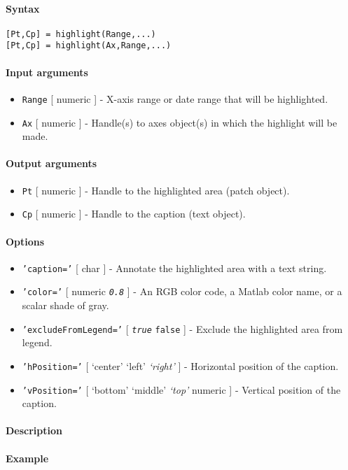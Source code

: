 


	\paragraph{Syntax}

\begin{verbatim}
[Pt,Cp] = highlight(Range,...)
[Pt,Cp] = highlight(Ax,Range,...)
\end{verbatim}

\paragraph{Input arguments}

\begin{itemize}
\item
  \texttt{Range} {[} numeric {]} - X-axis range or date range that will
  be highlighted.
\item
  \texttt{Ax} {[} numeric {]} - Handle(s) to axes object(s) in which the
  highlight will be made.
\end{itemize}

\paragraph{Output arguments}

\begin{itemize}
\item
  \texttt{Pt} {[} numeric {]} - Handle to the highlighted area (patch
  object).
\item
  \texttt{Cp} {[} numeric {]} - Handle to the caption (text object).
\end{itemize}

\paragraph{Options}

\begin{itemize}
\item
  \texttt{'caption='} {[} char {]} - Annotate the highlighted area with
  a text string.
\item
  \texttt{'color='} {[} numeric \textbar{} \emph{\texttt{0.8}} {]} - An
  RGB color code, a Matlab color name, or a scalar shade of gray.
\item
  \texttt{'excludeFromLegend='} {[} \emph{\texttt{true}} \textbar{}
  \texttt{false} {]} - Exclude the highlighted area from legend.
\item
  \texttt{'hPosition='} {[} `center' \textbar{} `left' \textbar{}
  \emph{`right'} {]} - Horizontal position of the caption.
\item
  \texttt{'vPosition='} {[} `bottom' \textbar{} `middle' \textbar{}
  \emph{`top'} \textbar{} numeric {]} - Vertical position of the
  caption.
\end{itemize}

\paragraph{Description}

\paragraph{Example}



